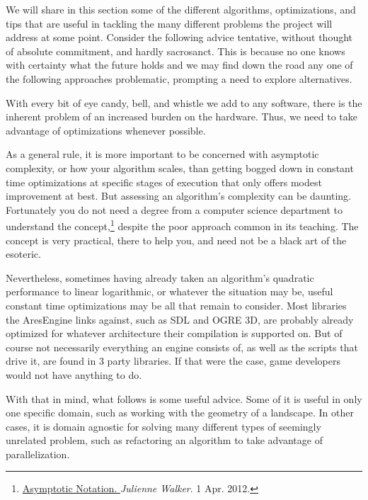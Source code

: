 
We will share in this section some of the different algorithms, optimizations, and tips that are useful in tackling the many different problems the project will address at some point. Consider the following advice tentative, without thought of absolute commitment, and hardly sacrosanct. This is because no one knows with certainty what the future holds and we may find down the road any one of the following approaches problematic, prompting a need to explore alternatives. 

With every bit of eye candy, bell, and whistle we add to any software, there is the inherent problem of an increased burden on the hardware. Thus, we need to take advantage of optimizations whenever possible. 

As a general rule, it is more important to be concerned with asymptotic complexity, or how your algorithm scales, than getting bogged down in constant time optimizations at specific stages of execution that only offers modest improvement at best. But assessing an algorithm's complexity can be daunting. Fortunately you do not need a degree from a computer science department to understand the concept,\footnote{\href{http://www.eternallyconfuzzled.com/arts/jsw_art_bigo.aspx}{Asymptotic Notation. }{\it Julienne Walker}. 1 Apr. 2012.} despite the poor approach common in its teaching. The concept is very practical, there to help you, and need not be a black art of the esoteric.

Nevertheless, sometimes having already taken an algorithm's quadratic performance to linear logarithmic, or whatever the situation may be, useful constant time optimizations may be all that remain to consider. Most libraries the AresEngine links against, such as SDL and OGRE 3D, are probably already optimized for whatever architecture their compilation is supported on. But of course not necessarily everything an engine consists of, as well as the scripts that drive it, are found in 3 party libraries. If that were the case, game developers would not have anything to do.

With that in mind, what follows is some useful advice. Some of it is useful in only one specific domain, such as working with the geometry of a landscape. In other cases, it is domain agnostic for solving many different types of seemingly unrelated problem, such as refactoring an algorithm to take advantage of parallelization.

